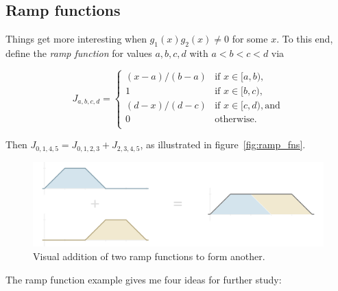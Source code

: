 \documentclass[20pt,]{extarticle}
\begin{document}
\subsection{Ramp functions}\label{sec:rampux5ffunctions}

Things get more interesting when \(g_1(x) g_2(x) \ne 0\) for some \(x\).
To this end, define the \emph{ramp function} for values \(a,b,c,d\) with
\(a < b < c < d\) via

\[ J_{a,b,c,d} = \begin{cases}
(x - a) / (b - a) & \text{if } x \in [a, b), \\
1 & \text{if } x \in [b, c), \\
(d - x) / (d - c) & \text{if } x \in [c, d), \text{and} \\
0 & \text{otherwise.} \\
\end{cases}\]

Then \(J_{0,1,4,5} = J_{0,1,2,3} + J_{2,3,4,5}\), as illustrated in
figure~\ref{fig:ramp_fns}.

\begin{figure}[htbp]
\centering
\includegraphics{images/ramp_fns3.png}
\caption{\label{fig:ramp_fns}Visual addition of two ramp functions to
form another.}\label{fig:rampux5ffns}
\end{figure}

The ramp function example gives me four ideas for further study:
\end{document}
